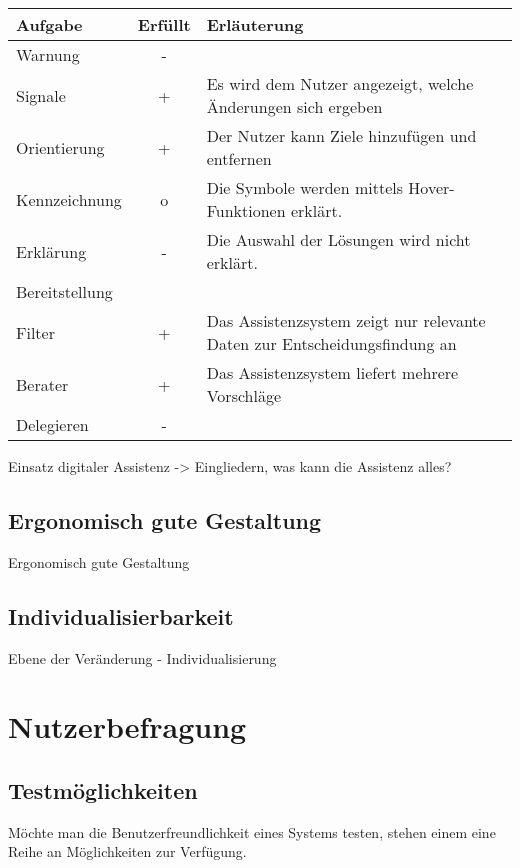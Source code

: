 \begin{table}
\centering
\begin{tabular}{l|c|p{}}
\textbf{Aufgabe} & \textbf{Erfüllt} & \textbf{Erläuterung} \\
\hline
Warnung & - & \\
\hline
Signale & + & Es wird dem Nutzer angezeigt, welche Änderungen sich ergeben\\
\hline
Orientierung & + & Der Nutzer kann Ziele hinzufügen und entfernen \\
\hline
Kennzeichnung & o & Die Symbole werden mittels Hover-Funktionen erklärt.\\
\hline
Erklärung & - & Die Auswahl der Lösungen wird nicht erklärt.\\
\hline
Bereitstellung & & \\
\hline
Filter & + & Das Assistenzsystem zeigt nur relevante Daten zur Entscheidungsfindung an \\
\hline
Berater & + & Das Assistenzsystem liefert mehrere Vorschläge \\
\hline
Delegieren & - & \\
\end{tabular}
\end{table}

Einsatz digitaler Assistenz -> Eingliedern, was kann die Assistenz alles?



\subsection*{Ergonomisch gute Gestaltung}
Ergonomisch gute Gestaltung

\subsection*{Individualisierbarkeit}
Ebene der Veränderung - Individualisierung


\section{Nutzerbefragung}


\subsection{Testmöglichkeiten}
Möchte man die Benutzerfreundlichkeit eines Systems testen, stehen einem eine Reihe an Möglichkeiten zur Verfügung.

